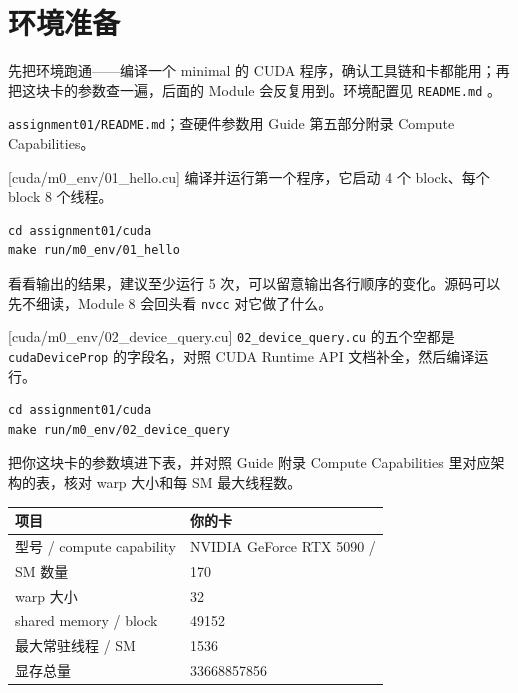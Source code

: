 \documentclass[11pt,a4paper,fontset=none]{ctexart}
\begin{document}
\setcounter{section}{-1}

\section{环境准备}

先把环境跑通——编译一个 minimal 的 CUDA 程序，确认工具链和卡都能用；再把这块卡的参数查一遍，后面的 Module 会反复用到。环境配置见 \texttt{README.md} 。

\begin{reading}
\texttt{assignment01/README.md}；查硬件参数用 Guide 第五部分附录 Compute Capabilities。
\end{reading}

[cuda/m0\_env/01\_hello.cu]
编译并运行第一个程序，它启动 4 个 block、每个 block 8 个线程。

\begin{lstlisting}
cd assignment01/cuda
make run/m0_env/01_hello
\end{lstlisting}

看看输出的结果，建议至少运行 5 次，可以留意输出各行顺序的变化。源码可以先不细读，Module 8 会回头看 \texttt{nvcc} 对它做了什么。

[cuda/m0\_env/02\_device\_query.cu]
\texttt{02\_device\_query.cu} 的五个空都是 \texttt{cudaDeviceProp} 的字段名，对照 CUDA Runtime API 文档补全，然后编译运行。

\begin{lstlisting}
cd assignment01/cuda
make run/m0_env/02_device_query
\end{lstlisting}

把你这块卡的参数填进下表，并对照 Guide 附录 Compute Capabilities 里对应架构的表，核对 warp 大小和每 SM 最大线程数。

\begin{center}\small
\begin{tabular}{@{}ll@{}}
\toprule
项目 & 你的卡 \\
\midrule
型号 / compute capability & NVIDIA GeForce RTX 5090 / \\
SM 数量 & 170\\
warp 大小 & 32 \\
shared memory / block & 49152\\
最大常驻线程 / SM & 1536\\
显存总量 & 33668857856\\
\bottomrule
\end{tabular}
\end{center}
\end{document}
